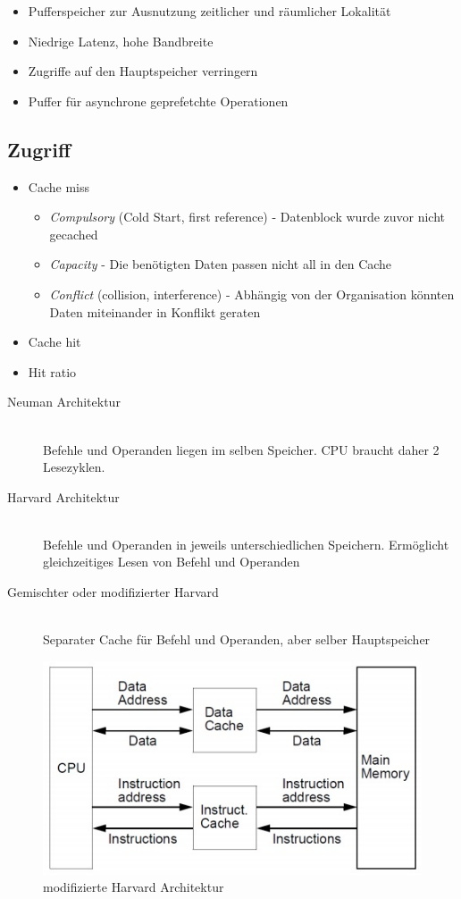 \documentclass[a4paper]{scrreprt}
\begin{document}
\begin{itemize}
\item Pufferspeicher zur Ausnutzung zeitlicher und räumlicher Lokalität
\item Niedrige Latenz, hohe Bandbreite 
\item Zugriffe auf den Hauptspeicher verringern
\item Puffer für asynchrone geprefetchte Operationen
\end{itemize}

\subsection{Zugriff}

\begin{itemize}
\item Cache miss
\begin{itemize}
\item \textit{Compulsory} (Cold Start, first reference) - Datenblock wurde zuvor nicht gecached
\item \textit{Capacity} - Die benötigten Daten passen nicht all in den Cache
\item \textit{Conflict} (collision, interference) - Abhängig von der Organisation könnten Daten miteinander in Konflikt geraten
\end{itemize}
\item Cache hit
\item Hit ratio
\end{itemize}

\begin{description}
\item[Neuman Architektur]\ \\ Befehle und Operanden liegen im selben Speicher. CPU braucht daher 2 Lesezyklen.
\item[Harvard Architektur]\ \\ Befehle und Operanden in jeweils unterschiedlichen Speichern. Ermöglicht gleichzeitiges Lesen von Befehl und Operanden
\item[Gemischter oder modifizierter Harvard]\ \\Separater Cache für Befehl und Operanden, aber selber Hauptspeicher
\end{description}

\begin{figure}[ht]
\centering
\includegraphics[scale=0.4]{graphics/modifiedharvard.png}
\caption{modifizierte Harvard Architektur}
\end{figure}
\end{document}
